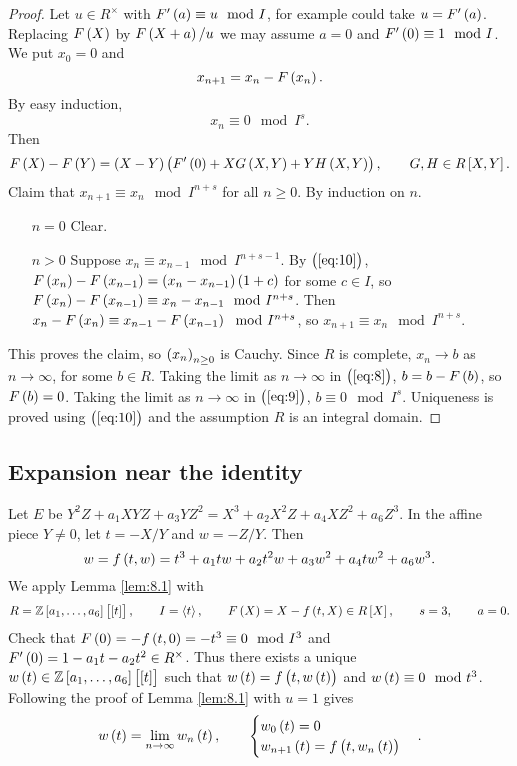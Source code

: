 \begin{proof}
Let $ u \in R^\times $ with $ F'\br{a} \equiv u \mod I $, for example could take $ u = F'\br{a} $. Replacing $ F\br{X} $ by $ F\br{X + a} / u $ we may assume $ a = 0 $ and $ F'\br{0} \equiv 1 \mod I $. We put $ x_0 = 0 $ and
\begin{equation}
\label{eq:8}
x_{n + 1} = x_n - F\br{x_n}.
\end{equation}
By easy induction,
\begin{equation}
\label{eq:9}
x_n \equiv 0 \mod I^s.
\end{equation}
Then
\begin{equation}
\label{eq:10}
F\br{X} - F\br{Y} = \br{X - Y}\br{F'\br{0} + XG\br{X, Y} + YH\br{X, Y}}, \qquad G, H \in R\sbr{X, Y}.
\end{equation}
Claim that $ x_{n + 1} \equiv x_n \mod I^{n + s} $ for all $ n \ge 0 $. By induction on $ n $.
\begin{itemize}[leftmargin=0.5in]
\item[$ n = 0 $] Clear.
\item[$ n > 0 $] Suppose $ x_n \equiv x_{n - 1} \mod I^{n + s - 1} $. By $ \br{\ref{eq:10}} $, $ F\br{x_n} - F\br{x_{n - 1}} = \br{x_n - x_{n - 1}}\br{1 + c} $ for some $ c \in I $, so $ F\br{x_n} - F\br{x_{n - 1}} \equiv x_n - x_{n - 1} \mod I^{n + s} $. Then $ x_n - F\br{x_n} \equiv x_{n - 1} - F\br{x_{n - 1}} \mod I^{n + s} $, so $ x_{n + 1} \equiv x_n \mod I^{n + s} $.
\end{itemize}
This proves the claim, so $ \br{x_n}_{n \ge 0} $ is Cauchy. Since $ R $ is complete, $ x_n \to b $ as $ n \to \infty $, for some $ b \in R $. Taking the limit as $ n \to \infty $ in $ \br{\ref{eq:8}} $, $ b = b - F\br{b} $, so $ F\br{b} = 0 $. Taking the limit as $ n \to \infty $ in $ \br{\ref{eq:9}} $, $ b \equiv 0 \mod I^s $. Uniqueness is proved using $ \br{\ref{eq:10}} $ and the assumption $ R $ is an integral domain.
\end{proof}

\subsection{Expansion near the identity}

Let $ E $ be $ Y^2Z + a_1XYZ + a_3YZ^2 = X^3 + a_2X^2Z + a_4XZ^2 + a_6Z^3 $. In the affine piece $ Y \ne 0 $, let $ t = -X / Y $ and $ w = -Z / Y $. Then
$$ w = f\br{t, w} = t^3 + a_1tw + a_2t^2w + a_3w^2 + a_4tw^2 + a_6w^3. $$
We apply Lemma \ref{lem:8.1} with
$$ R = \ZZ\sbr{a_1, \dots, a_6}\sbr{\sbr{t}}, \qquad I = \abr{t}, \qquad F\br{X} = X - f\br{t, X} \in R\sbr{X}, \qquad s = 3, \qquad a = 0. $$
Check that $ F\br{0} = -f\br{t, 0} = -t^3 \equiv 0 \mod I^3 $ and $ F'\br{0} = 1 - a_1t - a_2t^2 \in R^\times $. Thus there exists a unique $ w\br{t} \in \ZZ\sbr{a_1, \dots, a_6}\sbr{\sbr{t}} $ such that $ w\br{t} = f\br{t, w\br{t}} $ and $ w\br{t} \equiv 0 \mod t^3 $. Following the proof of Lemma \ref{lem:8.1} with $ u = 1 $ gives
$$ w\br{t} = \lim_{n \to \infty} w_n\br{t}, \qquad
\begin{cases}
w_0\br{t} = 0 \\
w_{n + 1}\br{t} = f\br{t, w_n\br{t}}
\end{cases}.
$$

